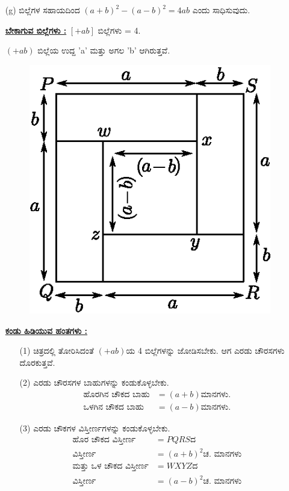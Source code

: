 \begin{enumerate}
\begin{itemize}
\end{itemize}

\item[(g)] ಬಿಲ್ಲೆಗಳ ಸಹಾಯದಿಂದ $(a+b)^2 - (a-b)^2 = 4ab$ ಎಂದು ಸಾಧಿಸುವುದು. 


\noindent
{\textbf{\underline{ಬೇಕಾಗುವ ಬಿಲ್ಲೆಗಳು :}}} $[+ab]$ ಬಿಲ್ಲೆಗಳು = 4. 

$(+ab)$ ಬಿಲ್ಲೆಯ ಉದ್ದ 'a' ಮತ್ತು ಅಗಲ 'b' ಆಗಿರುತ್ತವೆ.
\begin{figure}[H]
\centering
\includegraphics[scale=0.8]{src/figure/chap3/fig3-33.eps}
\end{figure}

\noindent
{\textbf{\underline{ಕಂಡು ಹಿಡಿಯುವ ಹಂತಗಳು :}}}
\begin{itemize}
\item[(1)] ಚಿತ್ರದಲ್ಲಿ ತೋರಿಸಿದಂತೆ $(+ab)$ಯ 4 ಬಿಲ್ಲೆಗಳನ್ನು ಜೋಡಿಸಬೇಕು. ಆಗ ಎರಡು ಚೌರಸಗಳು ದೊರಕುತ್ತವೆ. 
\item[(2)] ಎರಡು ಚೌರಸಗಳ ಬಾಹುಗಳನ್ನು ಕಂಡುಕೊಳ್ಳಬೇಕು.
\begin{align*}
\text{ಹೊರಗಿನ ಚೌಕದ ಬಾಹು} & = (a+b) \text{ಮಾನಗಳು.}\\
\text{ಒಳಗಿನ ಚೌಕದ ಬಾಹು} & = (a-b) \text{ಮಾನಗಳು.}
\end{align*}

\item[(3)] ಎರಡು ಚೌಕಗಳ ವಿಸ್ತೀರ್ಣಗಳನ್ನು ಕಂಡುಕೊಳ್ಳಬೇಕು. 
\begin{align*}
\text{ಹೊರ ಚೌಕದ ವಿಸ್ತೀರ್ಣ} & = PQRS\text{ದ}\\
 \text{ವಿಸ್ತೀರ್ಣ} & = (a+b)^2 \text{ಚ. ಮಾನಗಳು}\\
\text{ಮತ್ತು ಒಳ ಚೌಕದ ವಿಸ್ತೀರ್ಣ} & = WXYZ\text{ದ}\\
\text{ವಿಸ್ತೀರ್ಣ} & = (a-b)^2 \text{ಚ. ಮಾನಗಳು}
\end{align*}


\end{itemize}
\end{enumerate}
